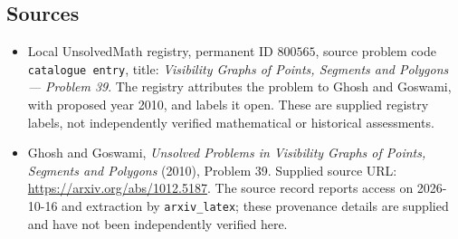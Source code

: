 \documentclass[11pt]{article}
\begin{document}
\subsection{Sources}
\begin{itemize}
\item Local UnsolvedMath registry, permanent ID \(800565\), source problem code \texttt{catalogue entry}, title: \emph{Visibility Graphs of Points, Segments and Polygons --- Problem 39}. The registry attributes the problem to Ghosh and Goswami, with proposed year 2010, and labels it open. These are supplied registry labels, not independently verified mathematical or historical assessments.
\item Ghosh and Goswami, \emph{Unsolved Problems in Visibility Graphs of Points, Segments and Polygons} (2010), Problem 39. Supplied source URL: \url{https://arxiv.org/abs/1012.5187}. The source record reports access on 2026-10-16 and extraction by \texttt{arxiv\_latex}; these provenance details are supplied and have not been independently verified here.
\end{itemize}
\end{document}
